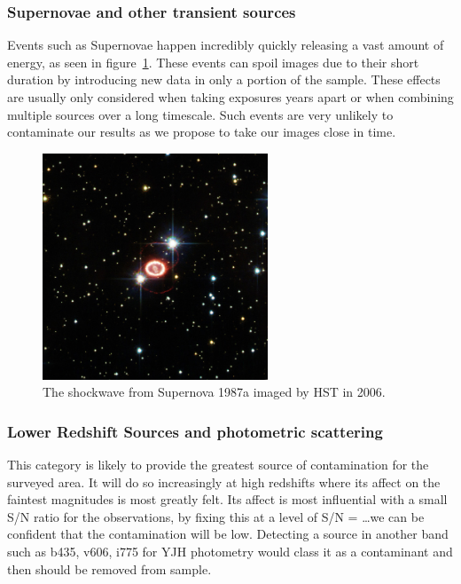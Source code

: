     \subsubsection{Supernovae and other transient sources} %
    \label{ssub:supernovae_and_other_transient_sources}
        Events such as Supernovae happen incredibly quickly releasing a vast amount of energy, as seen in figure~\ref{fig:SNe_1987a}. These events can spoil images due to their short duration by introducing new data in only a portion of the sample. These effects are usually only considered when taking exposures years apart or when combining multiple sources over a long timescale. Such events are very unlikely to contaminate our results as we propose to take our images close in time. 
        \begin{figure}[ht]
            \centering
            \includegraphics[width=0.6\textwidth]{../Images/SNe_1987a.jpg}
            \caption{The shockwave from Supernova 1987a imaged by HST in 2006.\label{fig:SNe_1987a}}
        \end{figure}

    \subsubsection{Lower Redshift Sources and photometric scattering} %
    \label{ssub:lower_redshift_sources_and_photometric_scattering}
        This category is likely to provide the greatest source of contamination for the surveyed area. It will do so increasingly at high redshifts where its affect on the faintest magnitudes is most greatly felt. Its affect is most influential with a small S/N ratio for the observations, by fixing this at a level of S/N = \ldots we can be confident that the contamination will be low. Detecting a source in another band such as b435, v606, i775 for YJH photometry would class it as a contaminant and then should be removed from sample.


